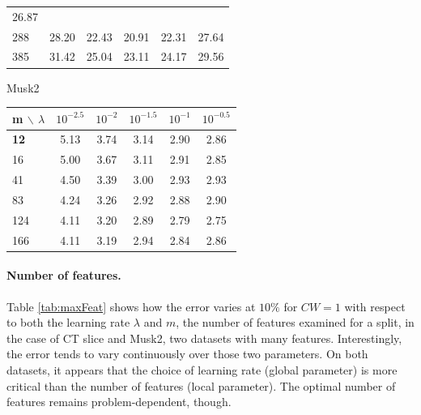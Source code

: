 \documentclass{article}
\begin{document}
\begin{table}[t]
\begin{center}
\begin{footnotesize}
\begin{tabular}{l|ccccc}
\cellcolor[gray]{0.61} 26.87 \\
288 & \cellcolor[gray]{0.55} 28.20 & \cellcolor[gray]{0.82} 22.43 & 
\cellcolor[gray]{0.89} 20.91 & \cellcolor[gray]{0.83} 22.31 & 
\cellcolor[gray]{0.58} 27.64 \\
385 & \cellcolor[gray]{0.40} 31.42 & \cellcolor[gray]{0.70} 25.04 & 
\cellcolor[gray]{0.79} 23.11 & \cellcolor[gray]{0.74} 24.17 & 
\cellcolor[gray]{0.49} 29.56 \\
\hline
\end{tabular}
\par
Musk2\\
\begin{tabular}{l|ccccc}
\hline
m $\backslash$ $\lambda$  &  $10^{-2.5}$ & $10^{-2}$ & $10^{-1.5}$ & 
$10^{-1}$ & $10^{-0.5}$ \\
\hline
{\bf 12} & \cellcolor[gray]{0.40} 5.13 & \cellcolor[gray]{0.75} 3.74 & 
\cellcolor[gray]{0.90} 3.14 & \cellcolor[gray]{0.96} 2.90 & 
\cellcolor[gray]{0.97} 2.86 \\
16 & \cellcolor[gray]{0.43} 5.00 & \cellcolor[gray]{0.77} 3.67 & 
\cellcolor[gray]{0.91} 3.11 & \cellcolor[gray]{0.96} 2.91 & 
\cellcolor[gray]{0.97} 2.85 \\
41 & \cellcolor[gray]{0.56} 4.50 & \cellcolor[gray]{0.84} 3.39 & 
\cellcolor[gray]{0.94} 3.00 & \cellcolor[gray]{0.95} 2.93 & 
\cellcolor[gray]{0.96} 2.93 \\
83 & \cellcolor[gray]{0.62} 4.24 & \cellcolor[gray]{0.87} 3.26 & 
\cellcolor[gray]{0.96} 2.92 & \cellcolor[gray]{0.97} 2.88 & 
\cellcolor[gray]{0.96} 2.90 \\
124 & \cellcolor[gray]{0.66} 4.11 & \cellcolor[gray]{0.89} 3.20 & 
\cellcolor[gray]{0.96} 2.89 & \cellcolor[gray]{0.99} 2.79 & 
\cellcolor[gray]{1.00} 2.75 \\
166 & \cellcolor[gray]{0.66} 4.11 & \cellcolor[gray]{0.89} 3.19 & 
\cellcolor[gray]{0.95} 2.94 & \cellcolor[gray]{0.98} 2.84 & 
\cellcolor[gray]{0.97} 2.86 \\
\hline
\end{tabular}
\end{footnotesize}
\end{center}
\vskip -0.2in
\end{table}

\paragraph{Number of features.}
Table \ref{tab:maxFeat} shows how the error varies at $10\%$ for $CW=1$ with 
respect to both the learning rate $\lambda$ and $m$, the number of features 
examined for a split, in the case of CT slice and Musk2, two datasets with many 
features.
Interestingly, the error tends to vary continuously over those two parameters. 
On both datasets, it appears that the choice of learning rate (global 
parameter) is more critical than the number of features (local parameter). The 
optimal number of features remains problem-dependent, though. 
\end{document}
